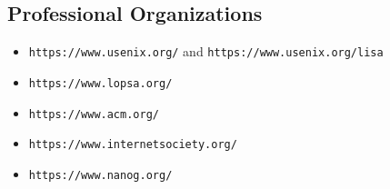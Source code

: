 \documentclass[xga]{xdvislides}
\begin{document}
\subsection{Professional Organizations}
\begin{itemize} \item \verb+https://www.usenix.org/+
and \verb+https://www.usenix.org/lisa+ \item
\verb+https://www.lopsa.org/+ \item
\verb+https://www.acm.org/+ \item
\verb+https://www.internetsociety.org/+ \item
\verb+https://www.nanog.org/+ \end{itemize}
\end{document}
